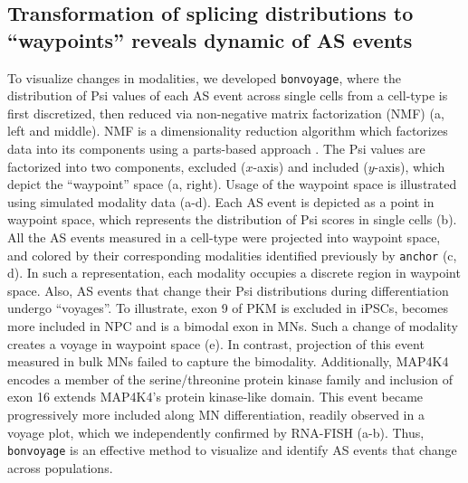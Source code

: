 \subsection{Transformation of splicing distributions to ``waypoints'' reveals dynamic of AS events}

To visualize changes in modalities, we developed \texttt{bonvoyage}, where the distribution of Psi values of each AS event across single cells from a cell-type is first discretized, then reduced via non-negative matrix factorization (NMF) (a, left and middle). NMF is a dimensionality reduction algorithm which factorizes data into its components using a parts-based approach \cite{Lee:1999gw}. The Psi values are factorized into two components, excluded ($x$-axis) and included ($y$-axis), which depict the ``waypoint'' space (a, right). Usage of the waypoint space is illustrated using simulated modality data (a-d). Each AS event is depicted as a point in waypoint space, which represents the distribution of Psi scores in single cells (b). All the AS events measured in a cell-type were projected into waypoint space, and colored by their corresponding modalities identified previously by \texttt{anchor} (c, d). In such a representation, each modality occupies a discrete region in waypoint space. Also, AS events that change their Psi distributions during differentiation undergo ``voyages''. To illustrate, exon 9 of PKM is excluded in iPSCs, becomes more included in NPC and is a bimodal exon in MNs. Such a change of modality creates a voyage in waypoint space (e). In contrast, projection of this event measured in bulk MNs failed to capture the bimodality. Additionally, MAP4K4 encodes a member of the serine/threonine protein kinase family and inclusion of exon 16 extends MAP4K4's protein kinase-like domain. This event became progressively more included along MN differentiation, readily observed in a voyage plot, which we independently confirmed by RNA-FISH (a-b). Thus, \texttt{bonvoyage} is an effective method to visualize and identify AS events that change across populations.




